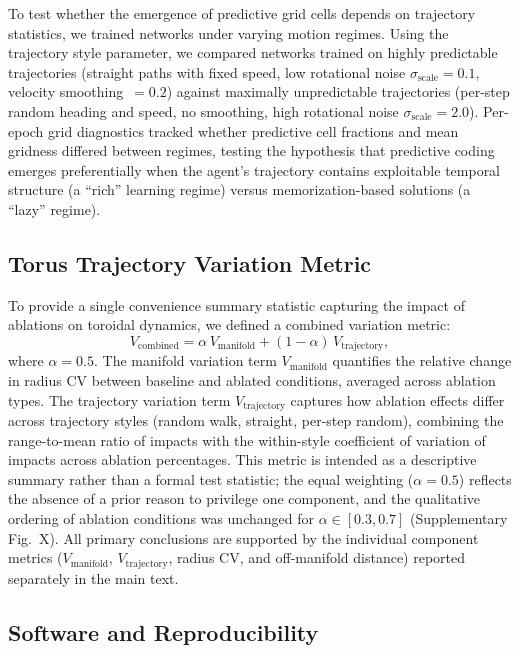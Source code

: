 \documentclass[11pt]{article}
\begin{document}
To test whether the emergence of predictive grid cells depends on trajectory statistics, we trained networks under varying motion regimes. Using the trajectory style parameter, we compared networks trained on highly predictable trajectories (straight paths with fixed speed, low rotational noise $\sigma_{\mathrm{scale}} = 0.1$, velocity smoothing~$= 0.2$) against maximally unpredictable trajectories (per-step random heading and speed, no smoothing, high rotational noise $\sigma_{\mathrm{scale}} = 2.0$). Per-epoch grid diagnostics tracked whether predictive cell fractions and mean gridness differed between regimes, testing the hypothesis that predictive coding emerges preferentially when the agent's trajectory contains exploitable temporal structure (a ``rich'' learning regime) versus memorization-based solutions (a ``lazy'' regime).


\subsection*{Torus Trajectory Variation Metric}

To provide a single convenience summary statistic capturing the impact of ablations on toroidal dynamics, we defined a combined variation metric:
\begin{equation}
    V_{\mathrm{combined}} = \alpha\,V_{\mathrm{manifold}} + (1 - \alpha)\,V_{\mathrm{trajectory}},
\end{equation}
where $\alpha = 0.5$. The manifold variation term $V_{\mathrm{manifold}}$ quantifies the relative change in radius CV between baseline and ablated conditions, averaged across ablation types. The trajectory variation term $V_{\mathrm{trajectory}}$ captures how ablation effects differ across trajectory styles (random walk, straight, per-step random), combining the range-to-mean ratio of impacts with the within-style coefficient of variation of impacts across ablation percentages. This metric is intended as a descriptive summary rather than a formal test statistic; the equal weighting ($\alpha = 0.5$) reflects the absence of a prior reason to privilege one component, and the qualitative ordering of ablation conditions was unchanged for $\alpha \in [0.3, 0.7]$ (Supplementary Fig.~X). All primary conclusions are supported by the individual component metrics ($V_{\mathrm{manifold}}$, $V_{\mathrm{trajectory}}$, radius CV, and off-manifold distance) reported separately in the main text.


\subsection*{Software and Reproducibility}
\end{document}
